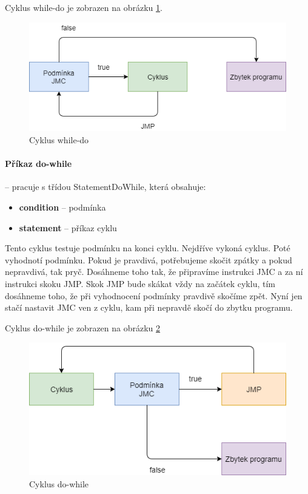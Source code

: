 \documentclass[
12pt,
a4paper,
pdftex,
czech,
titlepage
]{report}
\begin{document}
Cyklus while-do je zobrazen na obrázku \ref{whileDo}. 

\begin{figure}[H]
\caption{Cyklus while-do}
\label{whileDo}
\includegraphics[width=\textwidth]{whileDo.png}
\end{figure}

\paragraph{Příkaz do-while} -- pracuje s třídou StatementDoWhile, která obsahuje:
\begin{itemize}
\item \textbf{condition} -- podmínka
\item \textbf{statement} -- příkaz cyklu
\end{itemize}

Tento cyklus testuje podmínku na konci cyklu. Nejdříve vykoná cyklus. Poté vyhodnotí podmínku. Pokud je pravdivá, potřebujeme skočit zpátky a pokud nepravdivá, tak pryč. Dosáhneme toho tak, že připravíme instrukci JMC a za ní instrukci skoku JMP. Skok JMP bude skákat vždy na začátek cyklu, tím dosáhneme toho, že při vyhodnocení podmínky pravdivě skočíme zpět. Nyní jen stačí nastavit JMC ven z cyklu, kam při nepravdě skočí do zbytku programu.

Cyklus do-while je zobrazen na obrázku \ref{doWhile}

\begin{figure}[H]
\caption{Cyklus do-while}
\label{doWhile}
\includegraphics[width=\textwidth]{doWhile.png}
\end{figure}
\end{document}
